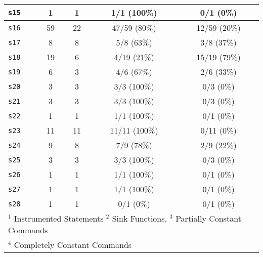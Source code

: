\begin{table}[t]
{\begin{tabular}{l c c c c}
	{\tt s15}&
	1  &
	1   &
	1/1 (100\%)   &
	0/1 (0\%)
	\\ \midrule
	
	{\tt s16}&
	59 &
	22   &
	47/59 (80\%)   &
	12/59 (20\%)
	\\ \midrule
	
	{\tt s17}&
	8 &
	8   &
	5/8 (63\%) &
	3/8 (37\%)
	\\ \midrule
	
	{\tt s18}&
	19  &
	6   &
	4/19 (21\%)   &
	15/19 (79\%) 
	\\ \midrule
	
	{\tt s19}&
	6  &
	3   &
	4/6 (67\%)   &
	2/6 (33\%)
		\\ \midrule
	
	{\tt s20}&
	3  &
	3   &
	3/3 (100\%)   &
	0/3 (0\%)
		\\ \midrule	
		
	{\tt s21}&
	3  &
    3     &
	3/3 (100\%)   &
	0/3 (0\%)
		\\ \midrule	
		
	{\tt s22}&
	1  &
	1   &
	1/1 (100\%)   &
	0/1 (0\%)
		\\ \midrule	
		
	{\tt s23}&
	11  &
	11   &
	11/11 (100\%)   &
	0/11 (0\%)
		\\ \midrule
		
	{\tt s24}&
	9  &
	8   &
	7/9 (78\%)   &
	2/9 (22\%)
		\\ \midrule
	
	{\tt s25}&
	3  &
	3   &
	3/3 (100\%)   &
	0/3 (0\%)
		\\ \midrule
	
	{\tt s26}&
	1  &
	1   &
	1/1 (100\%)   &
	0/1 (0\%)
		\\ \midrule
		
	{\tt s27}&
	1  &
	1   &
	 1/1 (100\%)   &
	 0/1 (0\%)
	\\ \midrule
		{\tt s28}&
	1 &
	1   &
	0/1 (0\%)   &
	0/1 (0\%)
	\\ 
	\bottomrule

	
	
\multicolumn{5}{l}{$^1$ Instrumented Statements $^2$ Sink Functions, $^3$ Partially Constant Commands} \\
\multicolumn{5}{l}{$^4$ Completely Constant Commands}

\end{tabular}
}
\end{table}
